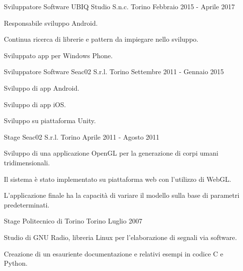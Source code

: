 \begin{cventries}
  \cventry
    {Sviluppatore Software} %
    {UBIQ Studio S.n.c.} %
    {Torino} %
    {Febbraio 2015 - Aprile 2017} %
    {
      \begin{cvitems} %
        \item {Responsabile sviluppo Android.}
        \item {Continua ricerca di librerie e pattern da impiegare nello sviluppo.}
        \item {Sviluppato app per Windows Phone.}
      \end{cvitems}
    }

  \cventry
    {Sviluppatore Software} %
    {Seac02 S.r.l.} %
    {Torino} %
    {Settembre 2011 - Gennaio 2015} %
    {
      \begin{cvitems} %
        \item {Sviluppo di app Android.}
        \item {Sviluppo di app iOS.}
        \item {Sviluppo su piattaforma Unity.}
      \end{cvitems}
    }

  \cventry
    {Stage} %
    {Seac02 S.r.l.} %
    {Torino} %
    {Aprile 2011 - Agosto 2011} %
    {
      \begin{cvitems} %
        \item {Sviluppo di una applicazione OpenGL per la generazione di corpi umani tridimensionali.}
        \item {Il sistema è stato implementato su piattaforma web con l'utilizzo di WebGL.}
        \item {L'applicazione finale ha la capacità di variare il modello sulla base di parametri predeterminati.}
      \end{cvitems}
    }

  \cventry
    {Stage} %
    {Politecnico di Torino} %
    {Torino} %
    {Luglio 2007} %
    {
      \begin{cvitems} %
        \item {Studio di GNU Radio, libreria Linux per l'elaborazione di segnali via software.}
        \item {Creazione di un esauriente documentazione e relativi esempi in codice C e Python.}
      \end{cvitems}
    }


\end{cventries}
